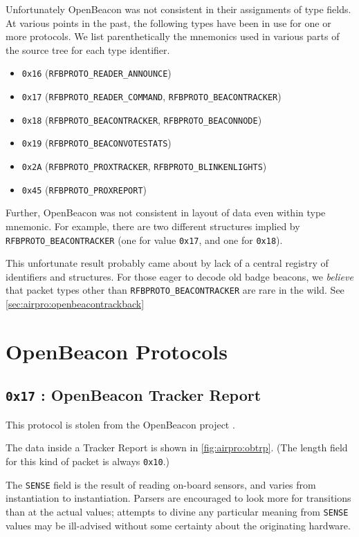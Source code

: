 Unfortunately OpenBeacon was not consistent
in their assignments of type fields.
At various points in the past,
the following types have been in use
for one or more protocols.
We list parenthetically the mnemonics
used in various parts of the source tree
for each type identifier.
\begin{itemize}
    \item {\tt 0x16} ({\tt RFBPROTO\_READER\_ANNOUNCE})
    \item {\tt 0x17} ({\tt RFBPROTO\_READER\_COMMAND}, {\tt RFBPROTO\_BEACONTRACKER})
    \item {\tt 0x18} ({\tt RFBPROTO\_BEACONTRACKER}, {\tt RFBPROTO\_BEACONNODE})
    \item {\tt 0x19} ({\tt RFBPROTO\_BEACONVOTESTATS})
    \item {\tt 0x2A} ({\tt RFBPROTO\_PROXTRACKER}, {\tt RFBPROTO\_BLINKENLIGHTS})
    \item {\tt 0x45} ({\tt RFBPROTO\_PROXREPORT})
\end{itemize}
Further, OpenBeacon was not consistent in layout of data
even within type mnemonic.
For example, there are two different
structures implied by {\tt RFBPROTO\_BEACONTRACKER}
(one for value {\tt 0x17}, and one for {\tt 0x18}).

This unfortunate result probably came about by lack of
a central registry of identifiers and structures.
For those eager to decode old badge beacons,
we {\em believe} that
packet types other than {\tt RFBPROTO\_BEACONTRACKER}
are rare in the wild.
See \autoref{sec:airpro:openbeacontrackback}

\section{OpenBeacon Protocols}

\subsection{{\tt 0x17} : OpenBeacon Tracker Report}
\label{sec:airpro:openbeacon}

This protocol is stolen
from the OpenBeacon project \cite{openbeacon}.

The data inside a Tracker Report
is shown in \autoref{fig:airpro:obtrp}.
(The length field
for this kind of packet
is always {\tt 0x10}.)

The {\tt SENSE} field is the
result of reading on-board sensors,
and varies
from instantiation to instantiation.
Parsers are encouraged
to look more for transitions
than at the actual values;
attempts to divine
any particular meaning
from {\tt SENSE} values
may be ill-advised
without some certainty
about the originating hardware.

